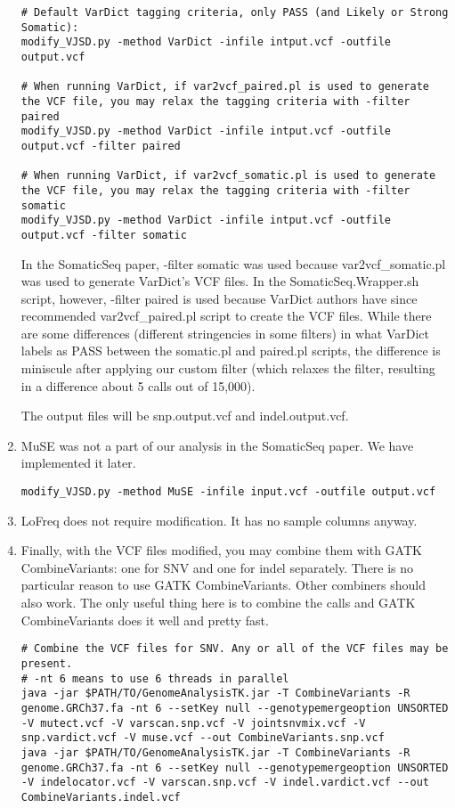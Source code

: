 \documentclass[10pt,letterpaper]{article}
\begin{document}
\begin{sloppypar}
\begin{enumerate}
\begin{lstlisting}
# Default VarDict tagging criteria, only PASS (and Likely or Strong Somatic):
modify_VJSD.py -method VarDict -infile intput.vcf -outfile output.vcf
	
# When running VarDict, if var2vcf_paired.pl is used to generate the VCF file, you may relax the tagging criteria with -filter paired
modify_VJSD.py -method VarDict -infile intput.vcf -outfile output.vcf -filter paired
	
# When running VarDict, if var2vcf_somatic.pl is used to generate the VCF file, you may relax the tagging criteria with -filter somatic
modify_VJSD.py -method VarDict -infile intput.vcf -outfile output.vcf -filter somatic
\end{lstlisting}
	

In the SomaticSeq paper, -filter somatic was used because var2vcf\_somatic.pl was used to generate VarDict's VCF files. In the SomaticSeq.Wrapper.sh script, however, -filter paired is used because VarDict authors have since recommended var2vcf\_paired.pl script to create the VCF files. While there are some differences (different stringencies in some filters) in what VarDict labels as PASS between the somatic.pl and paired.pl scripts, the difference is miniscule after applying our custom filter (which relaxes the filter, resulting in a difference about 5 calls out of 15,000). 

The output files will be snp.output.vcf and indel.output.vcf. 


\item
MuSE was not a part of our analysis in the SomaticSeq paper. We have implemented it later. 
	
\begin{lstlisting}
modify_VJSD.py -method MuSE -infile input.vcf -outfile output.vcf
\end{lstlisting}


\item
LoFreq does not require modification. It has no sample columns anyway. 


\item
Finally, with the VCF files modified, you may combine them with GATK CombineVariants: one for SNV and one for indel separately. There is no particular reason to use GATK CombineVariants. Other combiners should also work. The only useful thing here is to combine the calls and GATK CombineVariants does it well and pretty fast. 
	
\begin{lstlisting}
# Combine the VCF files for SNV. Any or all of the VCF files may be present.
# -nt 6 means to use 6 threads in parallel
java -jar $PATH/TO/GenomeAnalysisTK.jar -T CombineVariants -R genome.GRCh37.fa -nt 6 --setKey null --genotypemergeoption UNSORTED -V mutect.vcf -V varscan.snp.vcf -V jointsnvmix.vcf -V snp.vardict.vcf -V muse.vcf --out CombineVariants.snp.vcf
java -jar $PATH/TO/GenomeAnalysisTK.jar -T CombineVariants -R genome.GRCh37.fa -nt 6 --setKey null --genotypemergeoption UNSORTED -V indelocator.vcf -V varscan.snp.vcf -V indel.vardict.vcf --out CombineVariants.indel.vcf
\end{lstlisting}



\end{enumerate}
\end{sloppypar}
\end{document}
